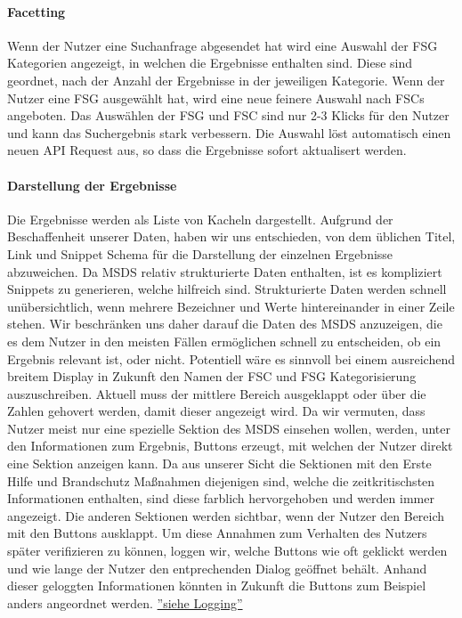 \documentclass[oneside, a4paper, 12pt, titlepage]{article}
\begin{document}
\paragraph{Facetting}
Wenn der Nutzer eine Suchanfrage abgesendet hat wird eine Auswahl der FSG Kategorien angezeigt, in welchen die Ergebnisse enthalten sind. Diese sind geordnet, nach der Anzahl der Ergebnisse in der jeweiligen Kategorie. Wenn der Nutzer eine FSG ausgewählt hat, wird eine neue feinere Auswahl nach FSCs angeboten. Das Auswählen der FSG und FSC sind nur 2-3 Klicks für den Nutzer und kann das Suchergebnis stark verbessern. Die Auswahl löst automatisch einen neuen API Request aus, so dass die Ergebnisse sofort aktualisert werden.

\paragraph{Darstellung der Ergebnisse}
Die Ergebnisse werden als Liste von Kacheln dargestellt. Aufgrund der Beschaffenheit unserer Daten, haben wir uns entschieden, von dem üblichen Titel, Link und Snippet Schema für die Darstellung der einzelnen Ergebnisse abzuweichen. Da MSDS relativ strukturierte Daten enthalten, ist es kompliziert Snippets zu generieren, welche hilfreich sind. Strukturierte Daten werden schnell unübersichtlich, wenn mehrere Bezeichner und Werte hintereinander in einer Zeile stehen. Wir beschränken uns daher darauf die Daten des MSDS anzuzeigen, die es dem Nutzer in den meisten Fällen ermöglichen schnell zu entscheiden, ob ein Ergebnis relevant ist, oder nicht. Potentiell wäre es sinnvoll bei einem ausreichend breitem Display in Zukunft den Namen der FSC und FSG Kategorisierung auszuschreiben. Aktuell muss der mittlere Bereich ausgeklappt oder über die Zahlen gehovert werden, damit dieser angezeigt wird. Da wir vermuten, dass Nutzer meist nur eine spezielle Sektion des MSDS einsehen wollen, werden, unter den Informationen zum Ergebnis, Buttons erzeugt, mit welchen der Nutzer direkt eine Sektion anzeigen kann. Da aus unserer Sicht die Sektionen mit den Erste Hilfe und Brandschutz Maßnahmen diejenigen sind, welche die zeitkritischsten Informationen enthalten, sind diese farblich hervorgehoben und werden immer angezeigt. Die anderen Sektionen werden sichtbar, wenn der Nutzer den Bereich mit den Buttons ausklappt. Um diese Annahmen zum Verhalten des Nutzers später verifizieren zu können, loggen wir, welche Buttons wie oft geklickt werden und wie lange der Nutzer den entprechenden Dialog geöffnet behält. Anhand dieser geloggten Informationen könnten in Zukunft die Buttons zum Beispiel anders angeordnet werden. \hyperref[logging]{''siehe Logging''}\\
\end{document}
